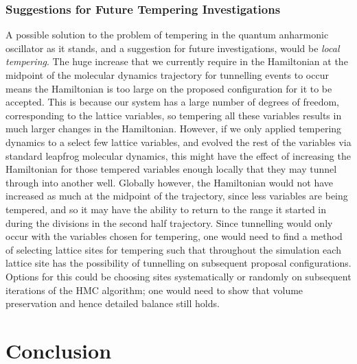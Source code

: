 \documentclass[12pt]{article}
\begin{document}
\subsubsection{Suggestions for Future Tempering Investigations}
A possible solution to the problem of tempering in the quantum anharmonic oscillator as it stands, and a suggestion for future investigations, would be \textit{local tempering}. The huge increase that we currently require in the Hamiltonian at the midpoint of the molecular dynamics trajectory for tunnelling events to occur means the Hamiltonian is too large on the proposed configuration for it to be accepted. This is because our system has a large number of degrees of freedom, corresponding to the lattice variables, so tempering all these variables results in much larger changes in the Hamiltonian. However, if we only applied tempering dynamics to a select few lattice variables, and evolved the rest of the variables via standard leapfrog molecular dynamics, this might have the effect of increasing the Hamiltonian for those tempered variables enough locally that they may tunnel through into another well. Globally however, the Hamiltonian would not have increased as much at the midpoint of the trajectory, since less variables are being tempered, and so it may have the ability to return to the range it started in during the divisions in the second half trajectory. Since tunnelling would only occur with the variables chosen for tempering, one would need to find a method of selecting lattice sites for tempering such that throughout the simulation each lattice site has the possibility of tunnelling on subsequent proposal configurations. Options for this could be choosing sites systematically or randomly on subsequent iterations of the HMC algorithm; one would need to show that volume preservation and hence detailed balance still holds.


\section{Conclusion}





\end{document}
